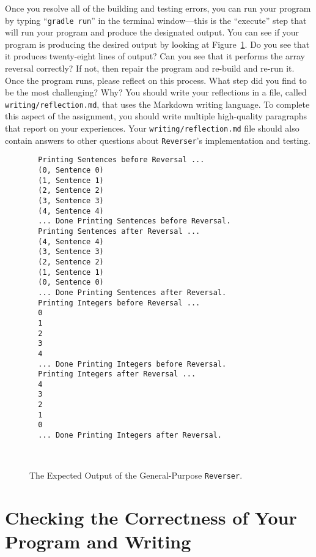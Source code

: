 \documentclass[11pt]{article}
\newcommand{\mainprogram}{\lstinline{Reverser}}
\newcommand{\mainprogramoutput}{twenty-eight}
\newcommand{\reflection}{\lstinline{writing/reflection.md}}
\newcommand{\gradlerun}{\command{gradle run}}
\newcommand{\command}[1]{``\lstinline{#1}''}
\begin{document}

Once you resolve all of the building and testing errors, you can run your
program by typing \gradlerun{} in the terminal window---this is the ``execute''
step that will run your program and produce the designated output. You can see
if your program is producing the desired output by looking at
Figure~\ref{fig:output}. Do you see that it produces \mainprogramoutput{} lines
of output? Can you see that it performs the array reversal correctly? If not,
then repair the program and re-build and re-run it. Once the program runs,
please reflect on this process. What step did you find to be the most
challenging? Why? You should write your reflections in a file, called
\reflection{}, that uses the Markdown writing language. To complete this aspect
of the assignment, you should write multiple high-quality paragraphs that report
on your experiences. Your \reflection{} file should also contain answers to
other questions about \mainprogram{}'s implementation and testing.

\begin{figure}[t]
  \centering
  \begin{verbatim}
  Printing Sentences before Reversal ...
  (0, Sentence 0)
  (1, Sentence 1)
  (2, Sentence 2)
  (3, Sentence 3)
  (4, Sentence 4)
  ... Done Printing Sentences before Reversal.
  Printing Sentences after Reversal ...
  (4, Sentence 4)
  (3, Sentence 3)
  (2, Sentence 2)
  (1, Sentence 1)
  (0, Sentence 0)
  ... Done Printing Sentences after Reversal.
  Printing Integers before Reversal ...
  0
  1
  2
  3
  4
  ... Done Printing Integers before Reversal.
  Printing Integers after Reversal ...
  4
  3
  2
  1
  0
  ... Done Printing Integers after Reversal.
  \end{verbatim}
  \vspace*{-.25in}
  \caption{The Expected Output of the General-Purpose \mainprogram{}.}~\label{fig:output}
  \vspace*{-.25in}
\end{figure}

\section*{Checking the Correctness of Your Program and Writing}
\end{document}
